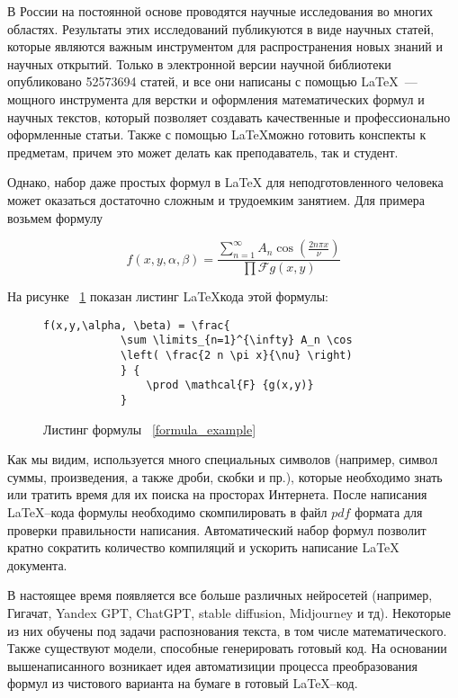 \introduction %

В России на постоянной основе проводятся научные исследования во многих областях. Результаты этих исследований публикуются в виде научных статей, которые являются важным инструментом для распространения новых знаний и научных открытий.
Только в электронной версии научной библиотеки опубликовано 52573694 \cite{eLib} статей, и все они написаны с помощью \LaTeX ~--- мощного инструмента для верстки и оформления математических формул и научных текстов, который позволяет создавать качественные и профессионально оформленные статьи. 
Также с помощью \LaTeX \quad можно готовить конспекты к предметам, причем это может делать как преподаватель, так и студент.

Однако, набор даже простых формул в LaTeX для неподготовленного человека может оказаться достаточно сложным и трудоемким занятием.
Для примера возьмем формулу

\begin{equation}
    \label{formula_example}
        f(x,y,\alpha, \beta) = \frac{\sum \limits_{n=1}^{\infty} 
        A_n \cos \left( \frac{2 n \pi x}{\nu} \right)} {\prod \mathcal{F} {g(x,y)} } 
\end{equation}

На рисунке ~\ref{formula_listing} показан листинг \LaTeX \quad кода этой формулы:

\begin{figure}
    \begin{lstlisting}[language={[LaTeX]Tex}]
        f(x,y,\alpha, \beta) = \frac{
            \sum \limits_{n=1}^{\infty} A_n \cos 
            \left( \frac{2 n \pi x}{\nu} \right)
            } {
                \prod \mathcal{F} {g(x,y)} 
            } 
    \end{lstlisting}
    \caption{Листинг формулы ~\ref{formula_example}}
    \label{formula_listing}
\end{figure}

Как мы видим, используется много специальных символов (например, символ суммы, произведения, а также дроби, скобки и пр.), которые необходимо знать или тратить время для их поиска на просторах Интернета. 
После написания \LaTeX --кода формулы необходимо скомпилировать в файл $pdf$ формата для проверки правильности написания. Автоматический набор формул позволит кратно сократить количество компиляций и ускорить написание \LaTeX\; документа. 

В настоящее время появляется все больше различных нейросетей (например, Гигачат, Yandex GPT, ChatGPT, stable diffusion, Midjourney и тд). Некоторые из них обучены под задачи распознования текста, в том числе математического. Также существуют модели, способные генерировать готовый код. 
На основании вышенаписанного возникает идея автоматизиции процесса преобразования формул из чистового варианта на бумаге в готовый  \LaTeX --код.

